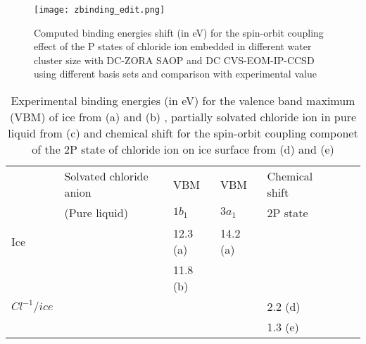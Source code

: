 \documentclass[a4paper,11pt]{report}
\begin{document}
\begin{figure}[H]\large
\captionsetup{font=footnotesize}
\texttt{[image: zbinding\_edit.png]}
\caption{Computed binding energies shift (in eV) for the spin-orbit coupling effect of the P states of chloride ion embedded in different water cluster size with DC-ZORA SAOP and DC CVS-EOM-IP-CCSD using different basis sets and comparison with experimental value}
\label{figure49}
\end{figure}



\begin{table}[H]\small
\begin{center}
\captionsetup{font=footnotesize}
\caption{Experimental binding energies (in eV) for the valence band maximum (VBM) of ice from (a) \citep{henderson2002interaction} and (b) \citep{shibaguchi1977electronic}, partially solvated chloride ion in pure liquid from (c) \citep{markovich1994photoelectron} and chemical shift for the spin-orbit coupling componet of the 2P state of chloride ion on ice surface from (d) \citep{kong2017coexistence} and (e) \citep{parent2011hcl}} \label{tab:1}
\begin{tabular}{|l|l|l|l|l|l|l|}
\hline
&Solvated chloride anion &\hspace*{0.4cm}VBM&\hspace*{0.4cm}VBM&\hspace*{0.2cm}Chemical shift\\
&\hspace*{0.6cm}(Pure liquid)&\hspace*{0.5cm}$1b_{1}$&\hspace*{0.5cm}$3a_{1}$&\hspace*{0.5cm}2P state\\ 
\hline
Ice&\hspace*{0.4cm}&\hspace*{0.4cm}12.3 (a)&\hspace*{0.4cm}14.2 (a)&\hspace*{0.4cm}\\
&&\hspace*{0.4cm}11.8 (b)&&\\
\hline
$Cl^{-1}/ice$&\hspace*{0.4cm}&\hspace*{0.4cm}&\hspace*{0.4cm}&\hspace*{0.4cm}2.2 (d)\\
&&\hspace*{0.4cm}&&\hspace*{0.4cm}1.3 (e)\\

\end{tabular}
\end{center}
\end{table}
\end{document}
